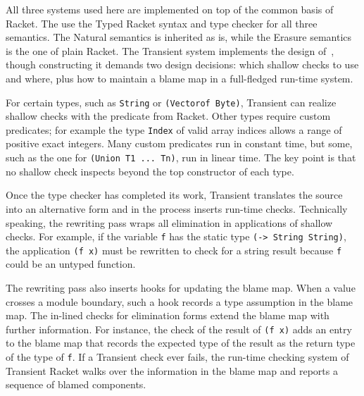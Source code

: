 All three systems used here are implemented on top of the common basis of
Racket. The use the Typed Racket syntax and type checker for all three
semantics. The Natural semantics is inherited as is, while the Erasure semantics
is the one of plain Racket.  The Transient system implements the design
of~\citet{vss-popl-2017}, though constructing it demands two design decisions:
which shallow checks to use and where, plus how to maintain a blame map in a
full-fledged run-time system. 

For certain types, such as {\tt String} or {\tt (Vectorof Byte)}, Transient can
realize shallow checks with the predicate from Racket.  Other types require
custom predicates; for example the type {\tt Index} of valid array indices
allows a range of positive exact integers.  Many custom predicates run in
constant time, but some, such as the one for {\tt (Union T1 ... Tn)}, run in
linear time. The key point is that no shallow check inspects beyond the top
constructor of each type.

Once the type checker has completed its work, Transient translates the source
into an alternative form and in the process inserts run-time checks. Technically
speaking, the rewriting pass wraps all elimination in applications of shallow
checks.  For example, if the variable {\tt f} has the static type {\tt (->
String String)}, the application {\tt (f x)} must be rewritten to check for a
string result because {\tt f} could be an untyped function.

The rewriting pass also inserts hooks for updating the blame map.  When a value
crosses a module boundary, such a hook records a type assumption in the blame
map.  The in-lined checks for elimination forms extend the blame map with
further information. For instance, the check of the result of {\tt (f x)} adds
an entry to the blame map that records the expected type of the result as the
return type of the type of {\tt f}.  If a Transient check ever fails, the
run-time checking system of Transient Racket walks over the information in the
blame map and reports a sequence of blamed components.



